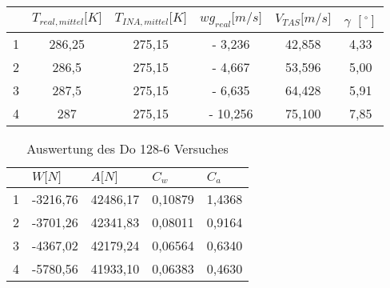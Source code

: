 \begin{table}[h]
	\centering
	\begin{tabular}{|c|c|c|c|c|c|}
		\hline
		& \multicolumn{1}{l|}{\textbf{$T_{real,mittel} {[}K{]}$}} & \multicolumn{1}{l|}{\textbf{$T_{INA,mittel} {[}K{]}$}} & \textbf{$wg_{real} {[}m/s{]}$} & \textbf{$V_{TAS} {[}m/s{]}$} & $\gamma$ $[^\circ]$ \\ \hline
		1 & 286,25                                        & 275,15                                       & - 3,236                     & 42,858                  & 4,33                   \\ \hline
		2 & 286,5                                         & 275,15                                       & - 4,667                    & 53,596                  & 5,00                   \\ \hline
		3 & 287,5                                         & 275,15                                       & - 6,635                    & 64,428                  & 5,91                   \\ \hline
		4 & 287                                           & 275,15                                       & - 10,256                   & 75,100                  & 7,85                   \\ \hline
	\end{tabular}
\end{table}

\begin{table}[h]
	\centering
	\begin{tabular}{|l|l|l|l|l|}
		\hline
		& \textbf{$W {[}N{]}$} & \textbf{$A {[}N{]}$} & \textbf{$C_w$} & \textbf{$C_a$} \\ \hline
		1 & -3216,76           & 42486,17           & 0,10879     & 1,4368      \\ \hline
		2 & -3701,26           & 42341,83           & 0,08011     & 0,9164      \\ \hline
		3 & -4367,02           & 42179,24           & 0,06564     & 0,6340      \\ \hline
		4 & -5780,56           & 41933,10           & 0,06383     & 0,4630      \\ \hline
	\end{tabular}
	\caption{Auswertung des Do 128-6 Versuches}
\end{table}








